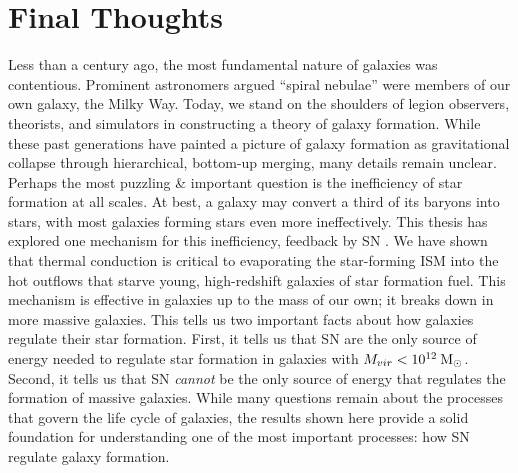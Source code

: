\section{Final Thoughts}
Less than a century ago, the most fundamental nature of galaxies was
contentious.  Prominent astronomers argued ``spiral nebulae'' were members of
our own galaxy, the Milky Way.  Today, we stand on the shoulders of legion
observers, theorists, and simulators in constructing a theory of galaxy
formation.  While these past generations have painted a picture of galaxy
formation as gravitational collapse through hierarchical, bottom-up merging,
many details remain unclear.  Perhaps the most puzzling \& important question is
the inefficiency of star formation at all scales.  At best, a galaxy may convert
a third of its baryons into stars, with most galaxies forming stars even more
ineffectively.  This thesis has explored one mechanism for this inefficiency,
feedback by SN .  We have shown that thermal conduction is critical to
evaporating the star-forming ISM into the hot outflows that starve young,
high-redshift galaxies of star formation fuel.  This mechanism is effective in
galaxies up to the mass of our own; it breaks down in more massive galaxies.
This tells us two important facts about how galaxies regulate their star
formation.  First, it tells us that SN are the only source of energy needed to
regulate star formation in galaxies with $M_{vir} < 10^{12}\>{\rm M_{\odot}}$.  Second, it
tells us that SN {\it cannot} be the only source of energy that regulates the
formation of massive galaxies.  While many questions remain about the processes
that govern the life cycle of galaxies, the results shown here provide a solid
foundation for understanding one of the most important processes: how SN
regulate galaxy formation.



